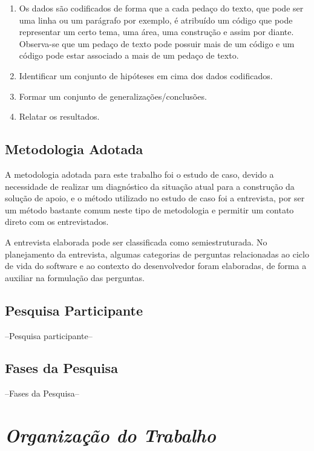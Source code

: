 \begin{enumerate}
	\item Os dados são codificados de forma que a cada pedaço do texto, que pode ser uma linha ou um parágrafo por exemplo, é atribuído um código que pode representar um certo tema, uma área, uma construção e assim por diante. Observa-se que um pedaço de texto pode possuir mais de um código e um código pode estar associado a mais de um pedaço de texto.
	\item Identificar um conjunto de hipóteses em cima dos dados codificados.
	\item Formar um conjunto de generalizações/conclusões.
	\item Relatar os resultados.
\end{enumerate}

\subsection{Metodologia Adotada}

A metodologia adotada para este trabalho foi o estudo de caso, devido a necessidade de realizar um diagnóstico da situação atual para a construção da solução de apoio, e o método utilizado no estudo de caso foi a entrevista, por ser um método bastante comum neste tipo de metodologia e permitir um contato direto com os entrevistados. 

A entrevista elaborada pode ser classificada como semiestruturada. No planejamento da entrevista, algumas categorias de perguntas relacionadas ao ciclo de vida do software e ao contexto do desenvolvedor foram elaboradas, de forma a auxiliar na formulação das perguntas.

\subsection{Pesquisa Participante}

--Pesquisa participante--
\subsection{Fases da Pesquisa}

--Fases da Pesquisa--

\section{\textit{Organização do Trabalho}}

